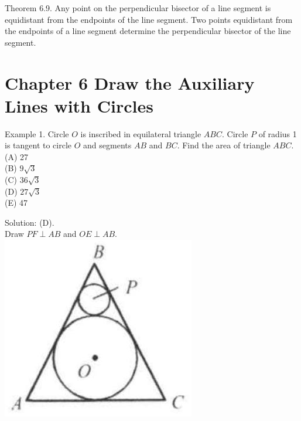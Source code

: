 \documentclass[10pt]{article}
\begin{document}
Theorem 6.9. Any point on the perpendicular bisector of a line segment is equidistant from the endpoints of the line segment. Two points equidistant from the endpoints of a line segment determine the perpendicular bisector of the line segment.

\section*{Chapter 6 Draw the Auxiliary Lines with Circles}
Example 1. Circle \(O\) is inscribed in equilateral triangle \(A B C\). Circle \(P\) of radius 1 is tangent to circle \(O\) and segments \(A B\) and \(B C\). Find the area of triangle \(A B C\).\\
(A) 27\\
(B) \(9 \sqrt{3}\)\\
(C) \(36 \sqrt{3}\)\\
(D) \(27 \sqrt{3}\)\\
(E) 47

Solution: (D).\\
Draw \(P F \perp A B\) and \(O E \perp A B\).\\
\includegraphics[max width=\textwidth, center]{2025_04_17_97bc1f7e44d93c271a88g-176}
\end{document}
